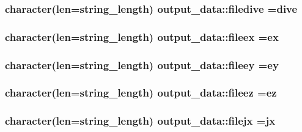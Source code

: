 \subsubsection[{\texorpdfstring{filedive}{filedive}}]{\setlength{\rightskip}{0pt plus 5cm}character(len=string\+\_\+length) output\+\_\+data\+::filedive =\textquotesingle{}dive\textquotesingle{}}\hypertarget{namespaceoutput__data_a655183a11c6badb83f94a4f05b94f95e}{}\label{namespaceoutput__data_a655183a11c6badb83f94a4f05b94f95e}
\subsubsection[{\texorpdfstring{fileex}{fileex}}]{\setlength{\rightskip}{0pt plus 5cm}character(len=string\+\_\+length) output\+\_\+data\+::fileex =\textquotesingle{}ex\textquotesingle{}}\hypertarget{namespaceoutput__data_aa8d95fb60904ef94d39d3c06ebc6d4d7}{}\label{namespaceoutput__data_aa8d95fb60904ef94d39d3c06ebc6d4d7}
\subsubsection[{\texorpdfstring{fileey}{fileey}}]{\setlength{\rightskip}{0pt plus 5cm}character(len=string\+\_\+length) output\+\_\+data\+::fileey =\textquotesingle{}ey\textquotesingle{}}\hypertarget{namespaceoutput__data_a368d30c58c5484d6e8caf5e536d2da0c}{}\label{namespaceoutput__data_a368d30c58c5484d6e8caf5e536d2da0c}
\subsubsection[{\texorpdfstring{fileez}{fileez}}]{\setlength{\rightskip}{0pt plus 5cm}character(len=string\+\_\+length) output\+\_\+data\+::fileez =\textquotesingle{}ez\textquotesingle{}}\hypertarget{namespaceoutput__data_ab01ba0f2c67ee55da96a855e8da8382c}{}\label{namespaceoutput__data_ab01ba0f2c67ee55da96a855e8da8382c}
\subsubsection[{\texorpdfstring{filejx}{filejx}}]{\setlength{\rightskip}{0pt plus 5cm}character(len=string\+\_\+length) output\+\_\+data\+::filejx =\textquotesingle{}jx\textquotesingle{}}\hypertarget{namespaceoutput__data_a1e0f229429f07c107635c7844afa8d39}{}\label{namespaceoutput__data_a1e0f229429f07c107635c7844afa8d39}
